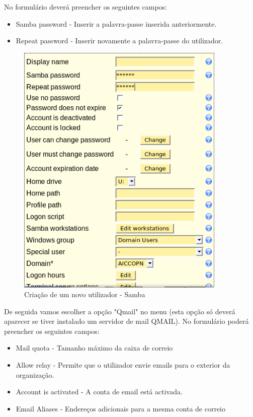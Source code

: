 No formulário deverá preencher os seguintes campos:

\begin{itemize}
\item Samba password - Inserir a palavra-passe inserida anteriormente.
\item Repeat password - Inserir novamente a palavra-passe do utilizador.
\end{itemize}

\begin{figure}[H]
    \begin{center}
        \includegraphics[width=10cm]{include/img/lam11}
    \end{center}
    \caption{Criação de um novo utilizador - Samba}
    \label{fig:LAM11}
\end{figure}

De seguida vamos escolher a opção "Qmail" no menu (esta opção só deverá aparecer se tiver instalado um servidor de mail QMAIL). No formulário poderá preencher os seguintes campos:

\begin{itemize}
\item Mail quota - Tamanho máximo da caixa de correio
\item Allow relay - Permite que o utilizador envie emails para o exterior da organização.
\item Account is activated - A conta de email está activada.
\item Email Aliases - Endereços adicionais para a mesma conta de correio
\end{itemize}

